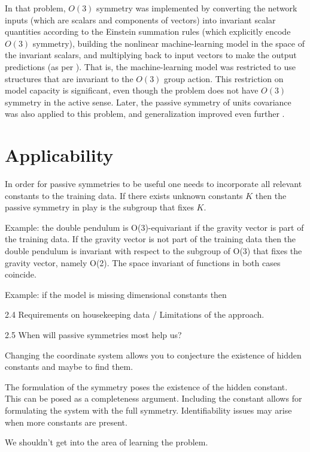 \documentclass{article}
\theoremstyle{plain}
\theoremstyle{definition}
\theoremstyle{remark}
\begin{document}
In that problem, $O(3)$ symmetry was implemented by converting the network inputs (which are scalars and components of vectors) into invariant scalar quantities according to the Einstein summation rules (which explicitly encode $O(3)$ symmetry), building the nonlinear machine-learning model in the space of the invariant scalars, and multiplying back to input vectors to make the output predictions (as per \citealt{villar2021scalars}).
That is, the machine-learning model was restricted to use structures that are invariant to the $O(3)$ group action.
This restriction on model capacity is significant, even though the problem does not have $O(3)$ symmetry in the active sense.
Later, the passive symmetry of units covariance was also applied to this problem, and generalization improved even further \cite{villar2022dimensionless}.

\section{Applicability}\label{sec:applicability}

In order for passive symmetries to be useful one needs to incorporate all relevant constants to the training data. If there exists unknown constants $K$ then the passive symmetry in play is the subgroup that fixes $K$.

Example: the double pendulum is O(3)-equivariant if the gravity vector is part of the training data. If the gravity vector is not part of the training data then the double pendulum is invariant with respect to the subgroup of O(3) that fixes the gravity vector, namely O(2). The space invariant of functions in both cases coincide.

Example: if the model is missing dimensional constants then 

   2.4 Requirements on housekeeping data / Limitations of the approach.

   2.5 When will passive symmetries most help us?
   
   Changing the coordinate system allows you to conjecture the existence of hidden constants and maybe to find them. 
   
   The formulation of the symmetry poses the existence of the hidden constant. This can be posed as a completeness argument. Including the constant allows for formulating the system with the full symmetry.
   Identifiability issues may arise when more constants are present.
   
   We shouldn't get into the area of learning the problem. 
\end{document}
